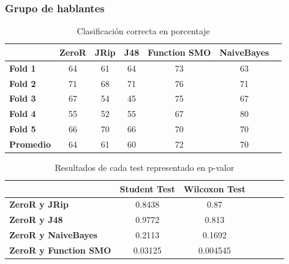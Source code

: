 \documentclass[mathserif]{beamer}%
\begin{document}
\begin{frame}
	\frametitle{Grupo de hablantes}
	
	\begin{table}[H]
		\centering
		\resizebox{9cm}{!} {
		\begin{tabular}{|l|c|c|c|c|c|c|}
			\hline
			\textbf{}  & \textbf{ZeroR} & \textbf{JRip} & \textbf{J48} & \textbf{Function SMO} & \textbf{NaiveBayes} \\ \hline
			\textbf{Fold 1}  & 64 & 61 & 64 & 73 & 63 \\ \hline
			\textbf{Fold 2}  & 71 & 68 & 71 & 76 & 71 \\ \hline
			\textbf{Fold 3}  & 67 & 54 & 45 & 75 & 67 \\ \hline
			\textbf{Fold 4}  & 55 & 52 & 55 & 67 & 80 \\ \hline
			\textbf{Fold 5}  & 66 & 70 & 66 & 70 & 70 \\ \hline
			\hline \hline
			\textbf{Promedio} & 64 & 61 & 60 & 72 & 70 \\ \hline
		\end{tabular}
		}
		\caption{Clasificación correcta en porcentaje}
		\label{class_corr_en_pct}
	\end{table}
	
	\begin{table}[H]
		\centering
		\resizebox{9cm}{!} {
		\begin{tabular}{|l|c|c|c|c|c|c|}
			\hline
			\textbf{}  & \textbf{Student Test} & \textbf{Wilcoxon Test} \\ \hline
			\textbf{ZeroR y JRip}  & 0.8438 & 0.87 \\ \hline
			\textbf{ZeroR y J48}  & 0.9772 & 0.813 \\ \hline
			\textbf{ZeroR y NaiveBayes}  & 0.2113 & 0.1692 \\ \hline
			\textbf{ZeroR y Function SMO}  & 0.03125 & 0.004545 \\ \hline
		\end{tabular}
		}
		\caption{Resultados de cada test representado en p-valor}
		\label{res_tests_wilcoxon_student}
	\end{table}
\end{frame}
\end{document}
